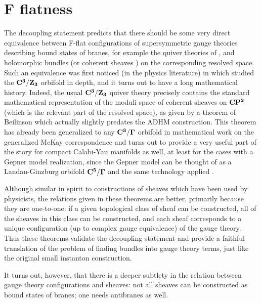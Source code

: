 \documentclass[a4paper,12pt]{amsart}
\numberwithin{equation}{section}
\theoremstyle{plain}
\theoremstyle{definition}
\def\Bbb#1{{\fam\black\relax#1}}
\def\Bbb{\bf}
\def\BC{\Bbb{C}}
\def\BP{\Bbb{P}}
\def\BZ{\Bbb{Z}}
\begin{document}
\section{F flatness}

The decoupling statement predicts that there should be some very
direct equivalence between F-flat configurations of supersymmetric
gauge theories describing bound states of branes, for example the
quiver theories of \cite{DGM}, and holomorphic bundles (or coherent
sheaves \cite{HarveyMoore}) on the corresponding resolved space.  Such
an equivalence was first noticed (in the physics literature) in
\cite{DFRtwo} which studied the $\BC^3/\BZ_3$ orbifold in depth, and
it turns out to have a long mathematical history.  Indeed, the usual
$\BC^3/\BZ_3$ quiver theory precisely contains the standard
mathematical representation of the moduli space of coherent sheaves on
$\BC\BP^2$ (which is the relevant part of the resolved space), as
given by a theorem of Beilinson \cite{Beilinson} which actually
slightly predates the ADHM construction.  This theorem has already
been generalized to any $\BC^3/\Gamma$ orbifold in mathematical work
on the generalized McKay correspondence \cite{Reid} and turns out to
provide a very useful part of the story for compact Calabi-Yau
manifolds as well, at least for the cases with a Gepner model
realization, since the Gepner model can be thought of as a
Landau-Ginzburg orbifold $\BC^5/\Gamma$ and the same technology
applied \cite{DD,GJ,Mayr,Tomas}.

Although similar in spirit to constructions of sheaves which have been
used by physicists, the relations given in these theorems are better,
primarily because they are one-to-one: if a given topological class of
sheaf can be constructed, all of the sheaves in this class can be
constructed, and each sheaf corresponds to a unique configuration (up
to complex gauge equivalence) of the gauge theory.  Thus these
theorems validate the decoupling statement and provide a faithful
translation of the problem of finding bundles into gauge theory terms,
just like the original small instanton construction.

It turns out, however, that there is a deeper subtlety in the relation
between gauge theory configurations and sheaves: not all sheaves can
be constructed as bound states of branes; one needs antibranes as
well.
\end{document}
